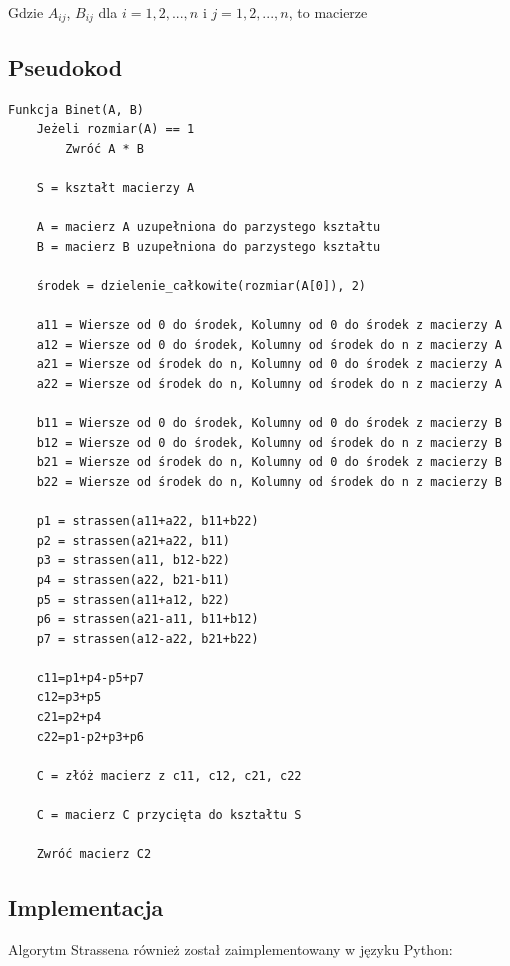 \documentclass{article}
\begin{document}
Gdzie \(A_{ij}\), \(B_{ij}\) dla \(i = {1, 2, ..., n}\) i \({j = {1, 2, ..., n}}\), to macierze

\subsection{Pseudokod}

\begin{verbatim}
Funkcja Binet(A, B)
    Jeżeli rozmiar(A) == 1
        Zwróć A * B

    S = kształt macierzy A

    A = macierz A uzupełniona do parzystego kształtu
    B = macierz B uzupełniona do parzystego kształtu

    środek = dzielenie_całkowite(rozmiar(A[0]), 2) 
    
    a11 = Wiersze od 0 do środek, Kolumny od 0 do środek z macierzy A
    a12 = Wiersze od 0 do środek, Kolumny od środek do n z macierzy A
    a21 = Wiersze od środek do n, Kolumny od 0 do środek z macierzy A
    a22 = Wiersze od środek do n, Kolumny od środek do n z macierzy A
    
    b11 = Wiersze od 0 do środek, Kolumny od 0 do środek z macierzy B
    b12 = Wiersze od 0 do środek, Kolumny od środek do n z macierzy B
    b21 = Wiersze od środek do n, Kolumny od 0 do środek z macierzy B
    b22 = Wiersze od środek do n, Kolumny od środek do n z macierzy B

    p1 = strassen(a11+a22, b11+b22)
    p2 = strassen(a21+a22, b11)
    p3 = strassen(a11, b12-b22)
    p4 = strassen(a22, b21-b11)
    p5 = strassen(a11+a12, b22)
    p6 = strassen(a21-a11, b11+b12)
    p7 = strassen(a12-a22, b21+b22)

    c11=p1+p4-p5+p7
    c12=p3+p5
    c21=p2+p4
    c22=p1-p2+p3+p6

    C = złóż macierz z c11, c12, c21, c22

    C = macierz C przycięta do kształtu S

    Zwróć macierz C2
\end{verbatim}

\subsection{Implementacja}

Algorytm Strassena również został zaimplementowany w języku Python:
\end{document}
